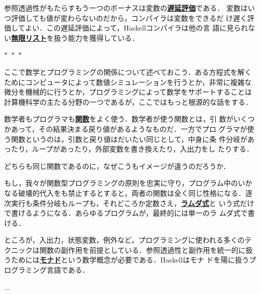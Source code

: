 \documentclass[a5paper,twoside,fleqn,draft]{jsbook}
\newcommand{\separator}{\begin{center}$*$~$*$~$*$\end{center}}
\newcommand{\programminglanguage}[1]{\textsf{#1}}
\newcommand{\clang}{\programminglanguage{C}}
\newcommand{\clangkr}{\programminglanguage{K\&R~C}}
\newcommand{\haskell}{\programminglanguage{Haskell}}
\newcommand{\keyword}[1]{{\underline{\textbf{#1}}}}
\newcommand{\code}[1]{\texttt{#1}}
\newenvironment{ccode}{\begin{itembox}[r]{\clang}}{\end{itembox}}
\newenvironment{ckrcode}{\begin{itembox}[r]{\clangkr}}{\end{itembox}}
\begin{document}
参照透過性がもたらすもう一つのボーナスは変数の\keyword{遅延評価}である．
変数はいつ評価しても値が変わらないのだから，コンパイラは変数をできるだ
け遅く評価してよい．この遅延評価によって，\haskell コンパイラは他の言
語に見られない\keyword{無限リスト}を扱う能力を獲得している．

\separator

ここで数学とプログラミングの関係について述べておこう．ある方程式を解く
ためにコンピュータによって数値シミュレーションを行うとか，非常に複雑な
微分を機械的に行うとか，プログラミングによって数学をサポートすることは
計算機科学の主たる分野の一つであるが，ここではもっと根源的な話をする．

数学者もプログラマも\keyword{関数}をよく使う．数学者が使う関数とは，引
数がいくつかあって，その結果決まる戻り値があるようなものだ．一方でプロ
グラマが使う関数というのは，引数と戻り値はだいたい同じとして，中身に条
件分岐があったり，ループがあったり，外部変数を書き換えたり，入出力をし
たりする．

どちらも同じ関数であるのに，なぜこうもイメージが違うのだろうか．

もし，我々が関数型プログラミングの原則を忠実に守り，プログラム中のいか
なる破壊的代入をも禁止するとすると，両者の関数は全く同じ性格になる．逐
次実行も条件分岐もループも，それどころか定数さえ，\keyword{ラムダ式}と
いう式だけで書けるようになる．あらゆるプログラムが，最終的には単一のラ
ムダ式で書ける．

ところが，入出力，状態変数，例外など，プログラミングに使われる多くのテ
クニックは関数の副作用を前提としている．参照透過性と副作用を統一的に扱
うためには\keyword{モナド}という数学概念が必要である．\haskell はモナ
ドを陽に扱うプログラミング言語である．

... %





\end{document}
